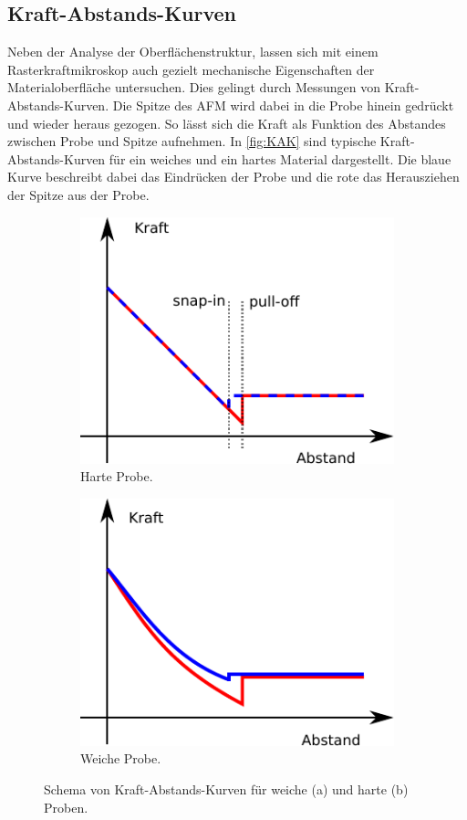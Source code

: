 \subsection{Kraft-Abstands-Kurven}
\label{sec:KAK}
Neben der Analyse der Oberflächenstruktur, lassen sich mit einem Rasterkraftmikroskop auch gezielt mechanische Eigenschaften der Materialoberfläche untersuchen. Dies gelingt durch Messungen von Kraft-Abstands-Kurven. Die Spitze des AFM wird dabei in die Probe hinein gedrückt und wieder heraus gezogen. So lässt sich die Kraft als Funktion des Abstandes zwischen Probe und Spitze aufnehmen.
In \autoref{fig:KAK} sind typische Kraft-Abstands-Kurven für ein weiches und ein hartes Material dargestellt. Die blaue Kurve beschreibt dabei das Eindrücken der Probe und die rote das Herausziehen der Spitze aus der Probe.
\begin{figure}[H]
  \centering
  \begin{subfigure}{0.45\textwidth}
    \includegraphics{content/plots/harte-theorie.pdf}
    \caption{Harte Probe.}
  \end{subfigure}
  \begin{subfigure}{0.45\textwidth}
    \includegraphics{content/plots/weiche-theorie.pdf}
    \caption{Weiche Probe.}
  \end{subfigure}
  \caption{Schema von Kraft-Abstands-Kurven für weiche (a) und harte (b) Proben.}
  \label{fig:KAK}
\end{figure}
